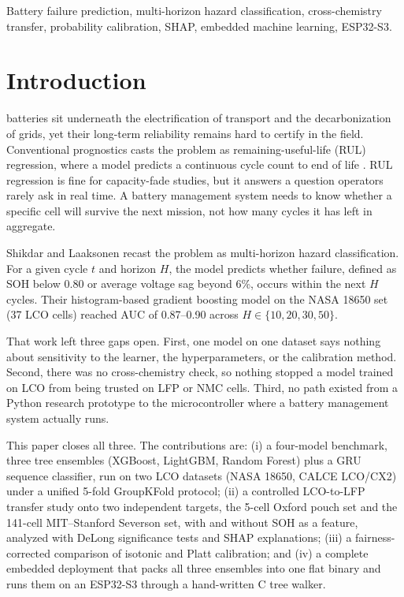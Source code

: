 \documentclass[journal]{IEEEtran}
\begin{document}
\begin{IEEEkeywords}
Battery failure prediction, multi-horizon hazard classification, cross-chemistry transfer, probability calibration, SHAP, embedded machine learning, ESP32-S3.
\end{IEEEkeywords}

\section{Introduction}
 batteries sit underneath the electrification of transport and the decarbonization of grids, yet their long-term reliability remains hard to certify in the field. Conventional prognostics casts the problem as remaining-useful-life (RUL) regression, where a model predicts a continuous cycle count to end of life \cite{meng2019review,breiman2001random,chen2016xgboost}. RUL regression is fine for capacity-fade studies, but it answers a question operators rarely ask in real time. A battery management system needs to know whether a specific cell will survive the next mission, not how many cycles it has left in aggregate.

Shikdar and Laaksonen \cite{shikdar2026learning} recast the problem as multi-horizon hazard classification. For a given cycle $t$ and horizon $H$, the model predicts whether failure, defined as SOH below 0.80 or average voltage sag beyond 6\%, occurs within the next $H$ cycles. Their histogram-based gradient boosting model on the NASA 18650 set (37 LCO cells) reached AUC of 0.87--0.90 across $H \in \{10,20,30,50\}$.

That work left three gaps open. First, one model on one dataset says nothing about sensitivity to the learner, the hyperparameters, or the calibration method. Second, there was no cross-chemistry check, so nothing stopped a model trained on LCO from being trusted on LFP or NMC cells. Third, no path existed from a Python research prototype to the microcontroller where a battery management system actually runs.

This paper closes all three. The contributions are: (i) a four-model benchmark, three tree ensembles (XGBoost, LightGBM, Random Forest) plus a GRU sequence classifier, run on two LCO datasets (NASA 18650, CALCE LCO/CX2) under a unified 5-fold GroupKFold protocol; (ii) a controlled LCO-to-LFP transfer study onto two independent targets, the 5-cell Oxford pouch set and the 141-cell MIT--Stanford Severson set, with and without SOH as a feature, analyzed with DeLong significance tests and SHAP explanations; (iii) a fairness-corrected comparison of isotonic and Platt calibration; and (iv) a complete embedded deployment that packs all three ensembles into one flat binary and runs them on an ESP32-S3 through a hand-written C tree walker.
\end{document}
